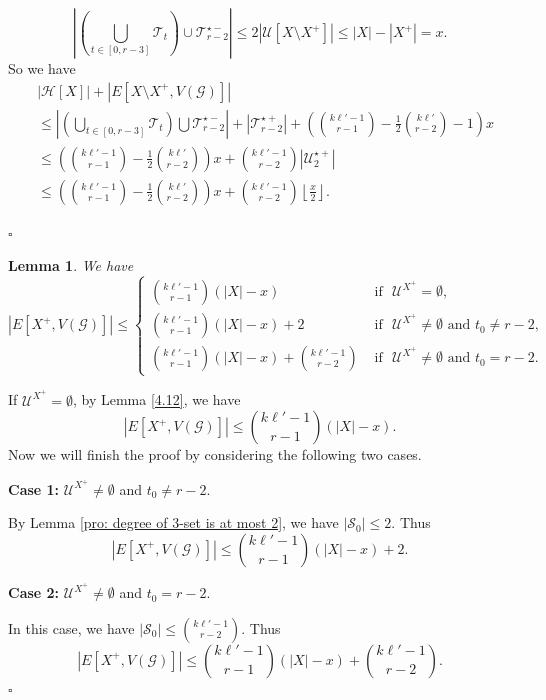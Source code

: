 \documentclass[12pt]{article}%
\newtheorem{lemma}[theorem]{Lemma}
\newenvironment{proof}{{\noindent\it Proof.}}{\hfill $\square$\par}
\newcommand{\mh}{\mathcal{H}}
\newcommand{\mg}{\mathcal{G}}
\newcounter{cases}
\begin{document}
\begin{proof}
\begin{equation*}\label{eq: when t_0=r-2}
    \left|\left(\bigcup_{t\in[0,r-3]}\mathcal{T}_t\right)\cup \mathcal{T}_{r-2}^{\star-}\right|\leq 2|\mathcal{U}[X\setminus X^+]|\leq|X|-|X^+|=x.
\end{equation*}So we have
\begin{equation*}
    \begin{aligned}
        &|\mh[X]|+|E[X\setminus X^+,V(\mg)]|\\
        &\leq \left|\left(\bigcup_{t\in[0,r-3]}\mathcal{T}_t\right)\bigcup\mathcal{T}_{r-2}^{\star-}\right|+\left|\mathcal{T}_{r-2}^{\star+}\right|+\left(\binom{k\ell'-1}{r-1}-\frac{1}{2}\binom{k\ell'}{r-2}-1\right)x\\
        &\leq  \left(\binom{k\ell'-1}{r-1}-\frac{1}{2}\binom{k\ell'}{r-2}\right)x+\binom{k\ell'-1}{r-2}|\mathcal{U}_2^{\star+}|\\
        &\leq\left(\binom{k\ell'-1}{r-1}-\frac{1}{2}\binom{k\ell'}{r-2}\right)x+\binom{k\ell'-1}{r-2}\left\lfloor\frac{x}{2}\right\rfloor.
    \end{aligned}
\end{equation*}
\par\noindent
\end{proof}



\begin{lemma}\label{X+V(mg)}
We have
$$    |E[X^{+},V(\mg)]|\leq\left\{
\begin{array}{ll}
\binom{k\ell'-1}{r-1}(|X|-x) & \mbox{ if ~$\mathcal{U}^{X^+}=\emptyset$,}\\
\binom{k\ell'-1}{r-1}(|X|-x)+2 & \mbox{ if ~$\mathcal{U}^{X^+}\not=\emptyset$ and $t_0 \neq r-2$,}\\
\binom{k\ell'-1}{r-1}(|X|-x)+\binom{k\ell'-1}{r-2} & \mbox{ if ~$\mathcal{U}^{X^+}\not=\emptyset$ and $t_0= r-2$.}
\end{array}
\right.$$
\end{lemma}
\begin{proof}
If $\mathcal{U}^{X^+}=\emptyset$, by Lemma \ref{4.12}, we have $$|E[X^+,V(\mg)]|\leq \binom{k\ell'-1}{r-1}(|X|-x). $$
Now we will finish the proof by considering the following two cases.

\noindent\textbf{Case 1:} $\mathcal{U}^{X^+}\not=\emptyset$ and $t_0\neq r-2$.

By Lemma \ref{pro: degree of 3-set is at most 2}, we have $|\mathcal{S}_0|\leq 2$. Thus
$$|E[X^{+},V(\mg)]|\leq \binom{k\ell'-1}{r-1}(|X|-x)+2.$$
\par\noindent
\textbf{Case 2:} $\mathcal{U}^{X^+}\not=\emptyset$ and
$t_0= r-2$.

In this case, we have $|\mathcal{S}_0|\leq \binom{k\ell'-1}{r-2}$. Thus
$$|E[X^{+},V(\mg)]|\leq \binom{k\ell'-1}{r-1}(|X|-x)+\binom{k\ell'-1}{r-2}.$$
\end{proof}
\end{document}
